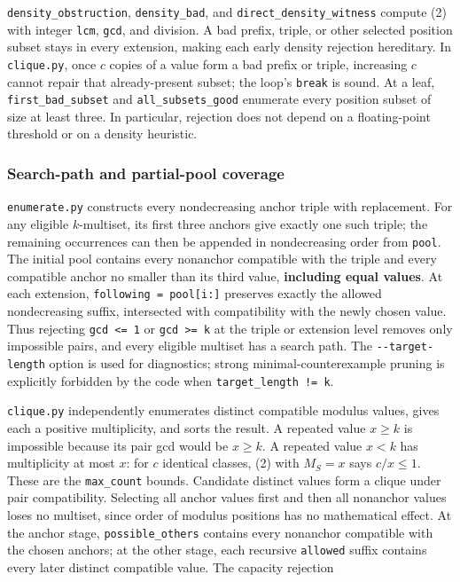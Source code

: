 \documentclass[11pt,a4paper]{article}
\begin{document}
\texttt{density\_obstruction}, \texttt{density\_bad}, and \texttt{direct\_density\_witness} compute (2) with integer \texttt{lcm}, \texttt{gcd}, and division. A bad prefix, triple, or other selected position subset stays in every extension, making each early density rejection hereditary. In \texttt{clique.py}, once \(c\) copies of a value form a bad prefix or triple, increasing \(c\) cannot repair that already-present subset; the loop's \texttt{break} is sound. At a leaf, \texttt{first\_bad\_subset} and \texttt{all\_subsets\_good} enumerate every position subset of size at least three. In particular, rejection does not depend on a floating-point threshold or on a density heuristic.

\subsubsection{Search-path and partial-pool coverage}\label{search-path-and-partial-pool-coverage}

\texttt{enumerate.py} constructs every nondecreasing anchor triple with replacement. For any eligible \(k\)-multiset, its first three anchors give exactly one such triple; the remaining occurrences can then be appended in nondecreasing order from \texttt{pool}. The initial pool contains every nonanchor compatible with the triple and every compatible anchor no smaller than its third value, \textbf{including equal values}. At each extension, \texttt{following\ =\ pool{[}i:{]}} preserves exactly the allowed nondecreasing suffix, intersected with compatibility with the newly chosen value. Thus rejecting \texttt{gcd\ \textless{}=\ 1} or \texttt{gcd\ \textgreater{}=\ k} at the triple or extension level removes only impossible pairs, and every eligible multiset has a search path. The \texttt{-\/-target-length} option is used for diagnostics; strong minimal-counterexample pruning is explicitly forbidden by the code when \texttt{target\_length\ !=\ k}.

\texttt{clique.py} independently enumerates distinct compatible modulus values, gives each a positive multiplicity, and sorts the result. A repeated value \(x\ge k\) is impossible because its pair gcd would be \(x\ge k\). A repeated value \(x<k\) has multiplicity at most \(x\): for \(c\) identical classes, (2) with \(M_S=x\) says \(c/x\le1\). These are the \texttt{max\_count} bounds. Candidate distinct values form a clique under pair compatibility. Selecting all anchor values first and then all nonanchor values loses no multiset, since order of modulus positions has no mathematical effect. At the anchor stage, \texttt{possible\_others} contains every nonanchor compatible with the chosen anchors; at the other stage, each recursive \texttt{allowed} suffix contains every later distinct compatible value. The capacity rejection
\end{document}
